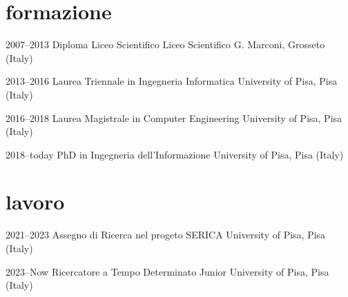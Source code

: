 \documentclass[]{style}
\begin{document}
\section{formazione}

\begin{entrylist}

\entry
{2007--2013}
{Diploma {\normalfont Liceo Scientifico}}
{Liceo Scientifico G. Marconi, Grosseto (Italy)}

\entry
{2013--2016}
{Laurea Triennale {\normalfont in Ingegneria Informatica}}
{University of Pisa, Pisa (Italy)}

\entry
{2016--2018}
{Laurea Magistrale {\normalfont in Computer Engineering}}
{University of Pisa, Pisa (Italy)}

\entry
{2018--today}
{PhD {\normalfont in Ingegneria dell'Informazione}}
{University of Pisa, Pisa (Italy)}

\end{entrylist}

\section{lavoro}
\begin{entrylist}
\entry
{2021--2023}
{Assegno di Ricerca {\normalfont nel progeto SERICA}}
{University of Pisa, Pisa (Italy)}

\entry
{2023--Now}
{Ricercatore a Tempo Determinato Junior}
{University of Pisa, Pisa (Italy)}

\end{entrylist}
\end{document}
